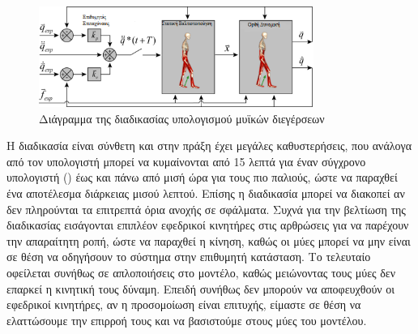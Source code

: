 \begin{figure}[H]
    \centering
    \includegraphics[width=0.8\textwidth, keepaspectratio]{fig/cmc-diagram.png}
    \caption{Διάγραμμα της διαδικασίας υπολογισμού μυϊκών διεγέρσεων \cite{thelen06}}
    \label{fig:cmc-diagram}
\end{figure}

Η διαδικασία είναι σύνθετη και στην πράξη έχει μεγάλες καθυστερήσεις, που ανάλογα από τον υπολογιστή μπορεί να κυμαίνονται από 15 λεπτά για έναν σύγχρονο υπολογιστή () έως και πάνω από μισή ώρα για τους πιο παλιούς, ώστε να παραχθεί ένα αποτέλεσμα διάρκειας μισού λεπτού. Επίσης η διαδικασία μπορεί να διακοπεί αν δεν πληρούνται τα επιτρεπτά όρια ανοχής σε σφάλματα. Συχνά για την βελτίωση της διαδικασίας εισάγονται επιπλέον εφεδρικοί κινητήρες στις αρθρώσεις για να παρέχουν την απαραίτητη ροπή, ώστε να παραχθεί η κίνηση, καθώς οι μύες μπορεί να μην είναι σε θέση να οδηγήσουν το σύστημα στην επιθυμητή κατάσταση. Το τελευταίο οφείλεται συνήθως σε απλοποιήσεις στο μοντέλο, καθώς μειώνοντας τους μύες δεν επαρκεί η κινητική τους δύναμη. Επειδή συνήθως δεν μπορούν να αποφευχθούν οι εφεδρικοί κινητήρες, αν η προσομοίωση είναι επιτυχής, είμαστε σε θέση να ελαττώσουμε την επιρροή τους και να βασιστούμε στους μύες του μοντέλου.

